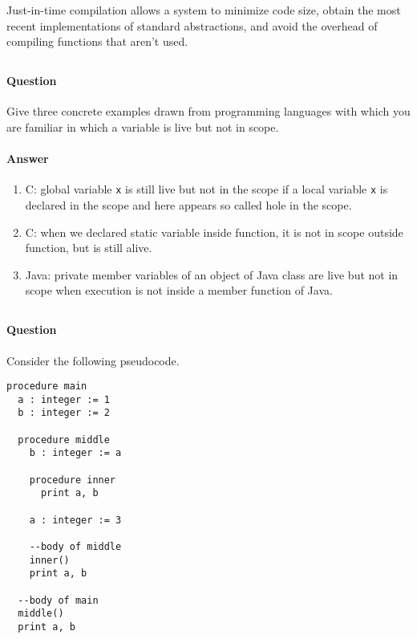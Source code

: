 \documentclass[5pt]{article}
\begin{document}
Just-in-time compilation allows a system to minimize code size, obtain the most recent implementations
of standard abstractions, and avoid the overhead of compiling functions that
aren’t used.
\subsection{}

\paragraph{Question}
Give three concrete examples drawn from programming languages with
which you are familiar in which a variable is live but not in scope.


\paragraph{Answer}
\begin{enumerate}
  \item C: global variable \verb|x| is still live but not in the scope if a
  local variable \verb|x| is declared in the scope and here appears so called
  hole in the scope.
  \item C: when we declared static variable inside function, it is not in scope
  outside function, but is still alive.
  \item Java: private member variables of an object of Java class are live but
not in scope when execution is not inside a member function of Java.
\end{enumerate}
\subsection{}

\paragraph{Question}
Consider the following pseudocode.

\begin{verbatim}
procedure main
  a : integer := 1
  b : integer := 2
  
  procedure middle
    b : integer := a
    
    procedure inner
      print a, b
      
    a : integer := 3
    
    --body of middle
    inner()
    print a, b
    
  --body of main
  middle()
  print a, b
\end{verbatim}
\end{document}
